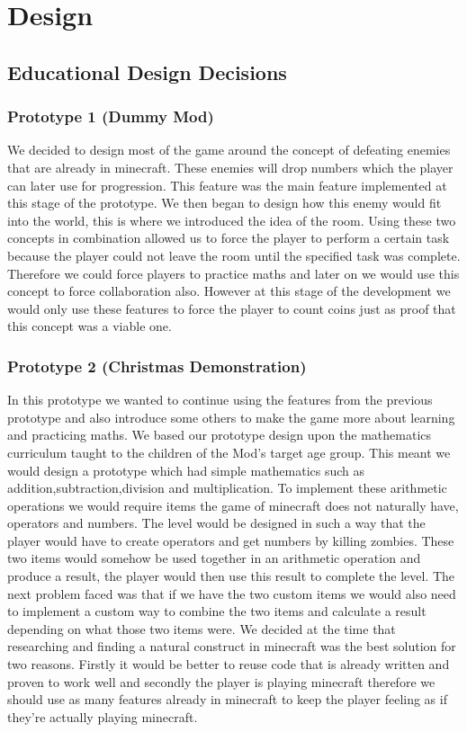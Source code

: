 \chapter{Design}
\label{ch:design}

\section{Educational Design Decisions}
\subsection{Prototype 1 (Dummy Mod)}
We decided to design most of the game around the concept of defeating enemies that are already in minecraft. These enemies will drop numbers which the player can later use for progression. This feature was the main feature implemented at this stage of the prototype. We then began to design how this enemy would fit into the world, this is where we introduced the idea of the room. Using these two concepts in combination allowed us to force the player to perform a certain task because the player could not leave the room until the specified task was complete. Therefore we could force players to practice maths and later on we would use this concept to force collaboration also. However at this stage of the development we would only use these features to force the player to count coins just as proof that this concept was a viable one.

\subsection{Prototype 2 (Christmas Demonstration)}
In this prototype we wanted to continue using the features from the previous prototype and also introduce some others to make the game more about learning and practicing maths. We based our prototype design upon the mathematics curriculum taught to the children of the Mod’s target age group. This meant we would design a prototype which had simple mathematics such as addition,subtraction,division and multiplication. To implement these arithmetic operations we would require items the game of minecraft does not naturally have, operators and numbers. The level would be designed in such a way that the player would have to create operators and get numbers by killing zombies. These two items would somehow be used together in an arithmetic operation and produce a result, the player would then use this result to complete the level. The next problem faced was that if we have the two custom items we would also need to implement a custom way to combine the two items and calculate a result depending on what those two items were. We decided at the time that researching and finding a natural construct in minecraft was the best solution for two reasons. Firstly it would be better to reuse code that is already written and proven to work well and secondly the player is playing minecraft therefore we should use as many features already in minecraft to keep the player feeling as if they’re actually playing minecraft.


